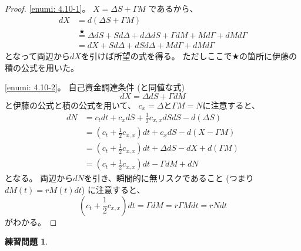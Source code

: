 \documentclass[uplatex]{jsarticle}
\theoremstyle{definition}
\newtheorem{prob}[prob]{練習問題}
\begin{document}
\begin{proof}
  \ref{enumi: 4.10-1}。
  \(X = \Delta S + \Gamma M\)
  であるから、
  \begin{align*}
    dX &= d (\Delta S + \Gamma M) \\
    &\overset{\bigstar}{=} \Delta dS + Sd\Delta + d\Delta dS
    + \Gamma dM + Md\Gamma + dM d\Gamma \\
    &= dX + Sd\Delta + dSd\Delta + Md\Gamma + dMd\Gamma
  \end{align*}
  となって両辺から\(dX\)を引けば所望の式を得る。
  ただしここで\(\bigstar\)の箇所に伊藤の積の公式を用いた。

  \ref{enumi: 4.10-2}。
  自己資金調達条件 (と同値な式)
  \[
  dX = \Delta dS + \Gamma dM
  \]
  と伊藤の公式と積の公式を用いて、
  \(c_x = \Delta\)と\(\Gamma M = N\)に注意すると、
  \begin{align*}
    dN &= c_tdt + c_xdS + \frac{1}{2}c_{x,x}dSdS
    - d(\Delta S) \\
    &= \left( c_t+\frac{1}{2}c_{x,x}\right)dt
    + c_xdS - d(X-\Gamma M) \\
    &= \left( c_t+\frac{1}{2}c_{x,x}\right)dt
    + \Delta dS - dX + d(\Gamma M) \\
    &= \left( c_t+\frac{1}{2}c_{x,x}\right)dt
    - \Gamma dM + dN
  \end{align*}
  となる。
  両辺から\(dN\)を引き、瞬間的に無リスクであること
   (つまり\(dM(t)=rM(t)dt\))
  に注意すると、
  \[
  \left( c_t+\frac{1}{2}c_{x,x}\right)dt
  = \Gamma dM = r\Gamma Mdt = rNdt
  \]
  がわかる。
\end{proof}



\begin{prob}\label{prob: 4.11}

\end{prob}
\end{document}
